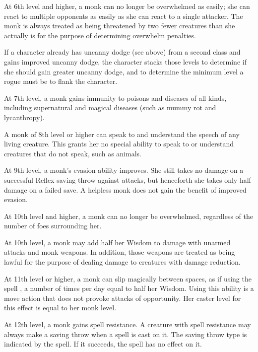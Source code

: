  At 6th level and higher, a monk can no longer be overwhelmed as easily; she can react to multiple opponents as easily as she can react to a single attacker. The monk is always treated as being threatened by two fewer creatures than she actually is for the purpose of determining overwhelm penalties.
\par If a character already has uncanny dodge (see above) from a
second class and gains improved uncanny dodge, the character stacks those levels to determine if she should gain greater uncanny dodge, and to determine the minimum level a rogue must be to flank the character.

 At 7th level, a monk gains immunity to poisons and diseases of all kinds, including supernatural and magical diseases (such as mummy rot and lycanthropy).

 A monk of 8th level or higher can speak to and understand the speech of any living creature. This grants her no special ability to speak to or understand creatures that do not speak, such as animals.

 At 9th level, a monk's evasion ability improves. She still takes no damage on a successful Reflex saving throw against attacks, but henceforth she takes only half damage on a failed save. A helpless monk does not gain the benefit of improved evasion.

 At 10th level and higher, a monk can no longer be overwhelmed, regardless of the number of foes surrounding her.

 At 10th level, a monk may add half her Wisdom to damage with unarmed attacks and monk weapons. In addition, those weapons are treated as being lawful for the purpose of dealing damage to creatures with damage reduction.

 At 11th level or higher, a monk can slip magically between spaces, as if using the spell , a number of times per day equal to half her Wisdom. Using this ability is a move action that does not provoke attacks of opportunity. Her caster level for this effect is equal to her monk level.

 At 12th level, a monk gains spell resistance. A creature with spell resistance may always make a saving throw when a spell is cast on it. The saving throw type is indicated by the spell. If it succeeds, the spell has no effect on it.

